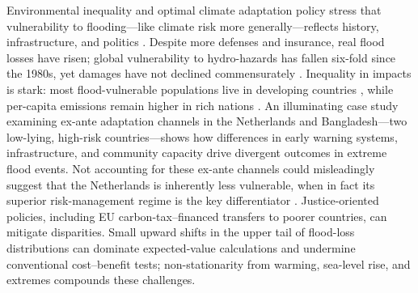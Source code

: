 Environmental inequality and optimal climate adaptation policy stress that vulnerability to flooding—like climate risk more generally—reflects history, infrastructure, and politics \citep{rentschler2022flood}. Despite more defenses and insurance, real flood losses have risen; global vulnerability to hydro-hazards has fallen six-fold since the 1980s, yet damages have not declined commensurately \citep{kreibich2022challenge}. Inequality in impacts is stark: most flood-vulnerable populations live in developing countries \citep{rentschler2022flood}, while per-capita emissions remain higher in rich nations \citep{gandhi2022adapting}. An illuminating case study examining ex-ante adaptation channels in the Netherlands and Bangladesh—two low-lying, high-risk countries—shows how differences in early warning systems, infrastructure, and community capacity drive divergent outcomes in extreme flood events. Not accounting for these ex-ante channels could misleadingly suggest that the Netherlands is inherently less vulnerable, when in fact its superior risk-management regime is the key differentiator \citep{tol2018economic}. Justice-oriented policies, including EU carbon-tax–financed transfers to poorer countries, can mitigate disparities. Small upward shifts in the upper tail of flood-loss distributions can dominate expected-value calculations and undermine conventional cost–benefit tests; non-stationarity from warming, sea-level rise, and extremes compounds these challenges. \\






